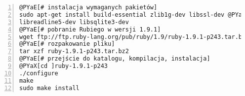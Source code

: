 \begin{Verbatim}[commandchars=@\[\],numbers=left,firstnumber=1,stepnumber=1]
@PYaE[# instalacja wymaganych pakietów]
sudo apt-get install build-essential zlib1g-dev libssl-dev @PYao[\]
libreadline5-dev libsqlite3-dev
@PYaE[# pobranie Rubiego w wersji 1.9.1]
wget ftp://ftp.ruby-lang.org/pub/ruby/1.9/ruby-1.9.1-p243.tar.bz2
@PYaE[# rozpakowanie pliku]
tar xzf ruby-1.9.1-p243.tar.bz2
@PYaE[# przejście do katalogu, kompilacja, instalacja]
@PYaX[cd ]ruby-1.9.1-p243
./configure
make
sudo make install
\end{Verbatim}
